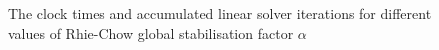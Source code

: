 \documentclass[sn-mathphys,Numbered]{sn-jnl}%
\begin{document}
\begin{figure}[htbp]
   \centering
   \caption{The clock times and accumulated linear solver iterations for different values of Rhie-Chow global stabilisation factor $\alpha$}
   \label{fig:times_rhie_chow}
\end{figure}

\end{document}

